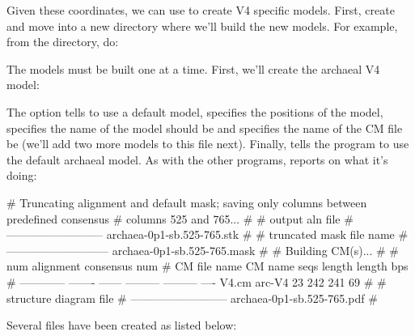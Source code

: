 Given these coordinates, we can use  to create V4
specific models. 
First, create and move into a new directory where we'll build the new
models. For example, from the  directory, do:


The models must be built one at a time. First, we'll
create the archaeal V4 model:


The  option tells  to use a default model,
 specifies the positions of the model, 
specifies the name of the model should be  and  specifies the name of the CM file be  (we'll add
two more models to this file next). Finally,  tells the
program to use the default archaeal model. As with the other programs,
 reports on what it's doing:

\begin{sreoutput}
# Truncating alignment and default mask; saving only columns between predefined consensus
# columns 525 and 765...
#
# output aln file           
# --------------------------
  archaea-0p1-sb.525-765.stk
#
# truncated mask file name   
# ---------------------------
  archaea-0p1-sb.525-765.mask
#
# Building CM(s)...
#
#                           num  alignment  consensus   num
# CM file name  CM name    seqs     length     length   bps
# ------------  -------  ------  ---------  ---------  ----
  V4.cm         arc-V4       23        242        241    69
#
# structure diagram file    
# --------------------------
  archaea-0p1-sb.525-765.pdf
#
\end{sreoutput}


Several files have been created as listed below:

